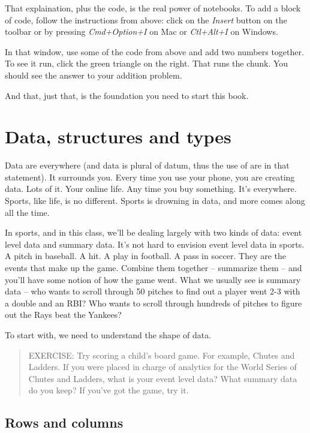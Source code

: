 \documentclass[
  letterpaper,
  DIV=11,
  numbers=noendperiod]{scrreprt}
\begin{document}
That explaination, plus the code, is the real power of notebooks. To add
a block of code, follow the instructions from above: click on the
\emph{Insert} button on the toolbar or by pressing \emph{Cmd+Option+I}
on Mac or \emph{Ctl+Alt+I} on Windows.

In that window, use some of the code from above and add two numbers
together. To see it run, click the green triangle on the right. That
runs the chunk. You should see the answer to your addition problem.

And that, just that, is the foundation you need to start this book.


\hypertarget{data-structures-and-types}{%
\chapter{Data, structures and types}\label{data-structures-and-types}}

Data are everywhere (and data is plural of datum, thus the use of are in
that statement). It surrounds you. Every time you use your phone, you
are creating data. Lots of it. Your online life. Any time you buy
something. It's everywhere. Sports, like life, is no different. Sports
is drowning in data, and more comes along all the time.

In sports, and in this class, we'll be dealing largely with two kinds of
data: event level data and summary data. It's not hard to envision event
level data in sports. A pitch in baseball. A hit. A play in football. A
pass in soccer. They are the events that make up the game. Combine them
together -- summarize them -- and you'll have some notion of how the
game went. What we usually see is summary data -- who wants to scroll
through 50 pitches to find out a player went 2-3 with a double and an
RBI? Who wants to scroll through hundreds of pitches to figure out the
Rays beat the Yankees?

To start with, we need to understand the shape of data.

\begin{quote}
EXERCISE: Try scoring a child's board game. For example, Chutes and
Ladders. If you were placed in charge of analytics for the World Series
of Chutes and Ladders, what is your event level data? What summary data
do you keep? If you've got the game, try it.
\end{quote}

\hypertarget{rows-and-columns}{%
\section{Rows and columns}\label{rows-and-columns}}
\end{document}
